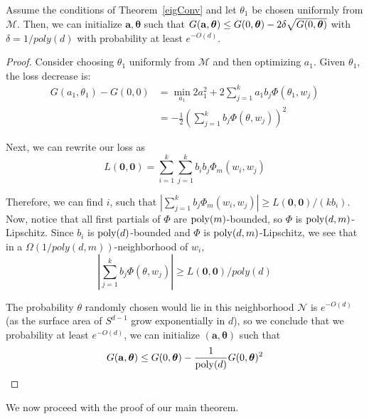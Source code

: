  \begin{lemma}\label{initialize}
Assume the conditions of Theorem~\ref{eigConv} and let $\theta_1$ be chosen uniformly from $\mathcal{M}$. Then, we can initialize $\boldsymbol{a,\theta}$ such that $G({\bf a, \boldsymbol{\theta}}) \leq G(0,\boldsymbol{\theta}) - 2\delta\sqrt{G(0,\boldsymbol{\theta})}$ with $\delta = 1/poly(d)$ with probability at least $e^{-O(d)}$.
 \end{lemma}
 
 \begin{proof}
  Consider choosing $\theta_1$ uniformly from $\mathcal{M}$ and then
  optimizing $a_1$. Given $\theta_1$, the loss decrease is:
%
\begin{align*}
   G(a_1,\theta_1) - G(0,0) & = \min_{a_1} 2a_1^2 +
  2\sum_{j=1}^k a_1 b_j\Phi(\theta_1,w_j) \\
 & = -\frac{1}{2}\left(  \sum_{j=1}^k b_j
   \Phi(\theta,w_j)\right)^2 
\end{align*}

Next, we can rewrite our loss as
%
\[L(\boldsymbol{0,0}) =  \sum_{i=1}^k\sum_{j=1}^k b_i b_j \Phi_m(w_i, w_j) \]

Therefore, we can find $i$, such that
$|\sum_{j=1}^k b_j \Phi_m(w_i, w_j)| \geq
L(\boldsymbol{0,0})/(kb_i)$. Now, notice that all first partials of $\Phi$ are $\mathrm{poly}(m)$-bounded, so $\Phi$ is $\mathrm{poly}(d, m)$- Lipschitz. Since $b_i$ is $\mathrm{poly}(d)$-bounded and $\Phi$ is $\mathrm{poly}(d,m)$-Lipschitz, we see
that in a $\Omega(1/poly(d,m))$-neighborhood of $w_i$,
%
\[|\sum_{j=1}^k b_j \Phi(\theta, w_j)| \geq L(\boldsymbol{0,0})/poly(d) \]

The probability $\theta$ randomly chosen would lie in this
neighborhood $\mathcal{N}$ is $e^{-O(d)}$ (as the surface area of $S^{d-1}$ grow exponentially in $d$), so we conclude that we probability at least $e^{-O(d)}$, we can initialize $(\boldsymbol{a,\theta})$ such that 
%
\[G({\bf a, \boldsymbol{\theta}}) \leq G(0,\boldsymbol{\theta}) - \frac{1}{\mathrm{poly}(d)}G(0,\boldsymbol{\theta})^2\]

\end{proof}

We now proceed with the proof of our main theorem.

